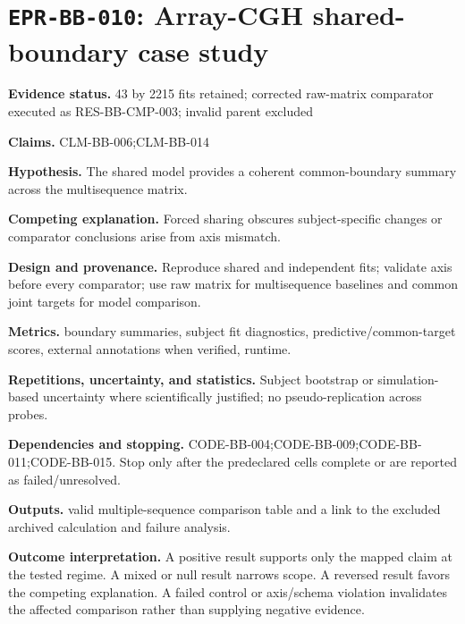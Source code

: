 \section[\texttt{EPR-BB-010}]{\texttt{EPR-BB-010}: Array-CGH shared-boundary case study}
\textbf{Evidence status.} 43 by 2215 fits retained; corrected raw-matrix comparator executed as RES-BB-CMP-003; invalid parent excluded\par
\textbf{Claims.} CLM-BB-006;CLM-BB-014\par
\textbf{Hypothesis.} The shared model provides a coherent common-boundary summary across the multisequence matrix.\par
\textbf{Competing explanation.} Forced sharing obscures subject-specific changes or comparator conclusions arise from axis mismatch.\par
\textbf{Design and provenance.} Reproduce shared and independent fits; validate axis before every comparator; use raw matrix for multisequence baselines and common joint targets for model comparison.\par
\textbf{Metrics.} boundary summaries, subject fit diagnostics, predictive/common-target scores, external annotations when verified, runtime.\par
\textbf{Repetitions, uncertainty, and statistics.} Subject bootstrap or simulation-based uncertainty where scientifically justified; no pseudo-replication across probes.\par
\textbf{Dependencies and stopping.} CODE-BB-004;CODE-BB-009;CODE-BB-011;CODE-BB-015. Stop only after the predeclared cells complete or are reported as failed/unresolved.\par
\textbf{Outputs.} valid multiple-sequence comparison table and a link to the excluded archived calculation and failure analysis.\par
\textbf{Outcome interpretation.} A positive result supports only the mapped claim at the tested regime. A mixed or null result narrows scope. A reversed result favors the competing explanation. A failed control or axis/schema violation invalidates the affected comparison rather than supplying negative evidence.

